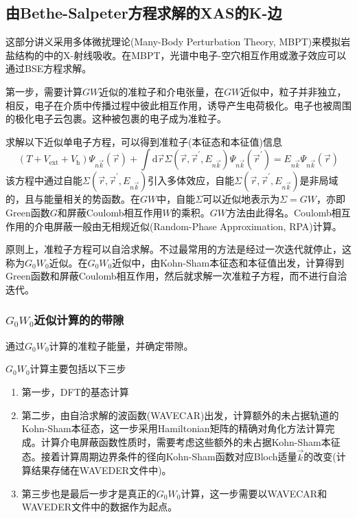 \subsection{由\rm{Bethe-Salpeter}方程求解的\rm{XAS}的\rm{K}-边}
这部分讲义采用多体微扰理论\textrm{(Many-Body Perturbation Theory, MBPT)}来模拟岩盐结构的中的\textrm{X}-射线吸收。在\textrm{MBPT}，光谱中电子-空穴相互作用或激子效应可以通过\textrm{BSE}方程求解。

第一步，需要计算$GW$近似的准粒子和介电张量，在$GW$近似中，粒子并非独立，相反，电子在介质中传播过程中彼此相互作用，诱导产生电荷极化。电子也被周围的极化电子云包裹。这种被包裹的电子成为准粒子。

求解以下近似单电子方程，可以得到准粒子(本征态和本征值)信息
\begin{displaymath}
	(T+V_{\mathrm{ext}}+V_{\mathrm{h}})\Psi_{n\vec k}(\vec r)+\int\mathrm{d}\vec r\Sigma(\vec r,\vec r^{\prime},E_{n\vec k})\Psi_{n\vec k}(\vec r^{\prime})=E_{n\vec k}\Psi_{n\vec k}(\vec r)
\end{displaymath}
该方程中通过自能$\Sigma(\vec r,\vec r^{\prime},E_{n\vec k})$引入多体效应，自能$\Sigma(\vec r,\vec r^{\prime},E_{n\vec k})$是非局域的，且与能量相关的势函数。在$GW$中，自能$\Sigma$可以近似地表示为$\Sigma=GW$，亦即\textrm{Green}函数$G$和屏蔽\textrm{Coulomb}相互作用$W$的乘积。$GW$方法由此得名。\textrm{Coulomb}相互作用的介电屏蔽一般由无相规近似\textrm{(Random-Phase Approximation, RPA)}计算。

原则上，准粒子方程可以自洽求解。不过最常用的方法是经过一次迭代就停止，这称为$G_0W_0$近似。在$G_0W_0$近似中，由\textrm{Kohn-Sham}本征态和本征值出发，计算得到\textrm{Green}函数和屏蔽\textrm{Coulomb}相互作用，然后就求解一次准粒子方程，而不进行自洽迭代。

\subsubsection{$G_0W_0$近似计算的的带隙}
通过$G_0W_0$计算的准粒子能量，并确定带隙。

$G_0W_0$计算主要包括以下三步
\begin{enumerate}
	\item 第一步，\textrm{DFT}的基态计算
	\item 第二步，由自洽求解的波函数\textrm{(WAVECAR)}出发，计算额外的未占据轨道的\textrm{Kohn-Sham}本征态，这一步采用\textrm{Hamiltonian}矩阵的精确对角化方法计算完成。计算介电屏蔽函数性质时，需要考虑这些额外的未占据\textrm{Kohn-Sham}本征态。接着计算周期边界条件的径向\textrm{Kohn-Sham}函数对应\textrm{Bloch}适量$\vec k$的改变(计算结果存储在\textrm{WAVEDER}文件中)。
	\item 第三步也是最后一步才是真正的$G_0W_0$计算，这一步需要以\textrm{WAVECAR}和\textrm{WAVEDER}文件中的数据作为起点。
\end{enumerate}

